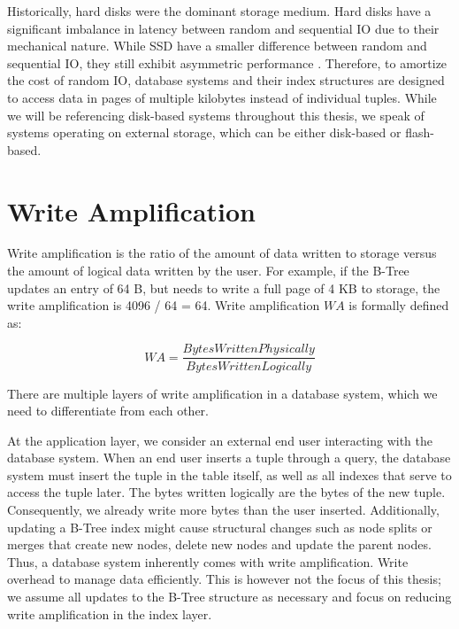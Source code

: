 Historically, hard disks were the dominant storage medium.
Hard disks have a significant imbalance in latency between random and sequential \ac{IO} due to their mechanical nature.
While \ac{SSD} have a smaller difference between random and sequential \ac{IO}, they still exhibit asymmetric performance \cite{haas2023modern}.
Therefore, to amortize the cost of random \ac{IO}, database systems and their index structures are designed to access data in pages of multiple kilobytes instead of individual tuples.
While we will be referencing disk-based systems throughout this thesis, we speak of systems operating on external storage, which can be either disk-based or flash-based.


\section{Write Amplification}
Write amplification is the ratio of the amount of data written to storage versus the amount of logical data written by the user.
For example, if the B-Tree updates an entry of 64 B, but needs to write a full page of 4 KB to storage, the write amplification is 4096 / 64 = 64.
Write amplification $WA$ is formally defined as:

\[
WA = \frac{Bytes Written Physically}{Bytes Written Logically}
\]

There are multiple layers of write amplification in a database system, which we need to differentiate from each other.

At the application layer, we consider an external end user interacting with the database system.
When an end user inserts a tuple through a query, the database system must insert the tuple in the table itself, as well as all indexes that serve to access the tuple later.
The bytes written logically are the bytes of the new tuple.
Consequently, we already write more bytes than the user inserted.
Additionally, updating a B-Tree index might cause structural changes such as node splits or merges that create new nodes, delete new nodes and update the parent nodes.
Thus, a database system inherently comes with write amplification. Write overhead to manage data efficiently.
This is however not the focus of this thesis; we assume all updates to the B-Tree structure as necessary and focus on reducing write amplification in the index layer.

